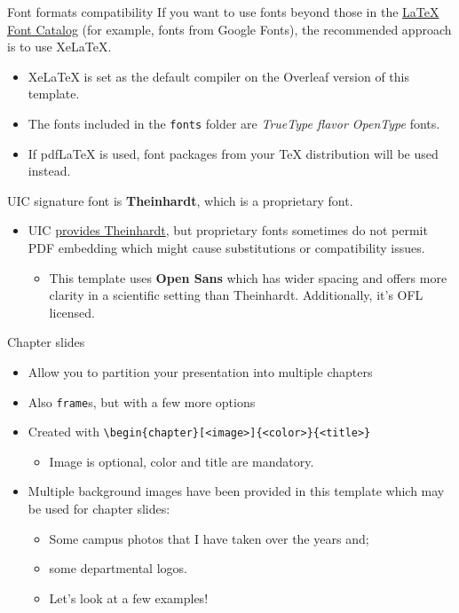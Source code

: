 \documentclass{beamer}
\newcommand{\hrefcol}[2]{\textcolor{uihteal}{\href{#1}{#2}}}
\begin{document}
\begin{frame}{Font formats compatibility}
If you want to use fonts beyond those in the \hrefcol{https://tug.org/FontCatalogue/}{LaTeX Font Catalog} (for example, fonts from Google Fonts), the recommended approach is to use XeLaTeX.
\begin{itemize}
\item XeLaTeX is set as the default compiler on the Overleaf version of this template.
\item The fonts included in the \texttt{fonts} folder are \emph{TrueType flavor OpenType} fonts.
\item If pdfLaTeX is used, font packages from your TeX distribution will be used instead.
\end{itemize}
UIC signature font is \textbf{Theinhardt}, which is a proprietary font.
\begin{itemize}
\item UIC \hrefcol{https://marketing.uic.edu/marketing-toolbox/uic-fonts/}{provides Theinhardt}, but proprietary fonts sometimes do not permit PDF embedding which might cause substitutions or compatibility issues.
\begin{itemize}
    \item This template uses \textbf{Open Sans} which has wider spacing and offers more clarity in a scientific setting than Theinhardt. Additionally, it's OFL licensed.
\end{itemize}
\end{itemize}
\end{frame}


\begin{frame}[fragile]{Chapter slides}
\begin{itemize}
\item Allow you to partition your presentation into multiple chapters
\item Also \texttt{frame}s, but with a few more options
\item Created with \verb|\begin{chapter}[<image>]{<color>}{<title>}|
  \begin{itemize}
  \item Image is optional, color and title are mandatory.
  \end{itemize}
\item Multiple background images have been provided in this template which may be used for chapter slides:
  \begin{itemize}
  \item Some campus photos that I have taken over the years and;
  \item some departmental logos.
  \item Let's look at a few examples!
  \end{itemize}
\end{itemize}
\end{frame}
\end{document}
